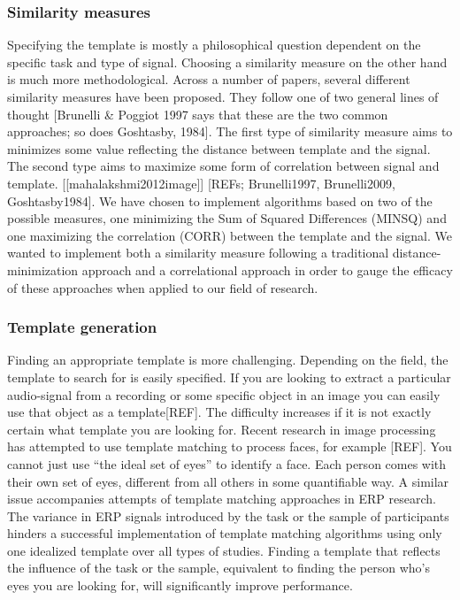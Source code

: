 \documentclass[
  man,floatsintext]{apa7}
\begin{document}
\hypertarget{similarity-measures}{%
\subsubsection{Similarity measures}\label{similarity-measures}}

Specifying the template is mostly a philosophical question dependent on the specific task and type of signal. Choosing a similarity measure on the other hand is much more methodological. Across a number of papers, several different similarity measures have been proposed. They follow one of two general lines of thought {[}Brunelli \& Poggiot 1997 says that these are the two common approaches; so does Goshtasby, 1984{]}. The first type of similarity measure aims to minimizes some value reflecting the distance between template and the signal. The second type aims to maximize some form of correlation between signal and template. {[}{[}mahalakshmi2012image{]}{]} {[}REFs; Brunelli1997, Brunelli2009, Goshtasby1984{]}. We have chosen to implement algorithms based on two of the possible measures, one minimizing the Sum of Squared Differences (MINSQ) and one maximizing the correlation (CORR) between the template and the signal. We wanted to implement both a similarity measure following a traditional distance-minimization approach and a correlational approach in order to gauge the efficacy of these approaches when applied to our field of research.

\hypertarget{template-generation}{%
\subsubsection{Template generation}\label{template-generation}}

Finding an appropriate template is more challenging. Depending on the field, the template to search for is easily specified. If you are looking to extract a particular audio-signal from a recording or some specific object in an image you can easily use that object as a template{[}REF{]}. The difficulty increases if it is not exactly certain what template you are looking for. Recent research in image processing has attempted to use template matching to process faces, for example {[}REF{]}. You cannot just use ``the ideal set of eyes'' to identify a face. Each person comes with their own set of eyes, different from all others in some quantifiable way. A similar issue accompanies attempts of template matching approaches in ERP research. The variance in ERP signals introduced by the task or the sample of participants hinders a successful implementation of template matching algorithms using only one idealized template over all types of studies. Finding a template that reflects the influence of the task or the sample, equivalent to finding the person who's eyes you are looking for, will significantly improve performance.
\end{document}
